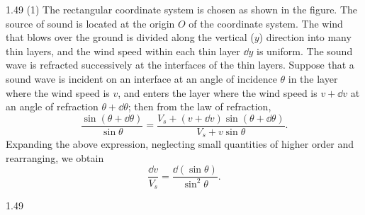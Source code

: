 \begin{solution}{1.49}
(1) The rectangular coordinate system is chosen as shown in the figure. The source of sound is located at the origin $O$ of the coordinate system. The wind that blows over the ground is divided along the vertical ($y$) direction into many thin layers, and the wind speed within each thin layer $\dd y$ is uniform. The sound wave is refracted successively at the interfaces of the thin layers. Suppose that a sound wave is incident on an interface at an angle of incidence $\theta$ in the layer where the wind speed is $v$, and enters the layer where the wind speed is $v+\dd v$ at an angle of refraction $\theta+\dd\theta$; then from the law of refraction,
\[
\frac{\sin(\theta+\dd\theta)}{\sin\theta}
=\frac{V_s+(v+\dd v)\sin(\theta+\dd\theta)}{V_s+v\sin\theta}.
\]
Expanding the above expression, neglecting small quantities of higher order and rearranging, we obtain
\[
\frac{\dd v}{V_s}=\frac{\dd\left(\sin\theta\right)}{\sin^2\theta}.
\]

\begin{figbox}{1.49}
\end{figbox}


\end{solution}
